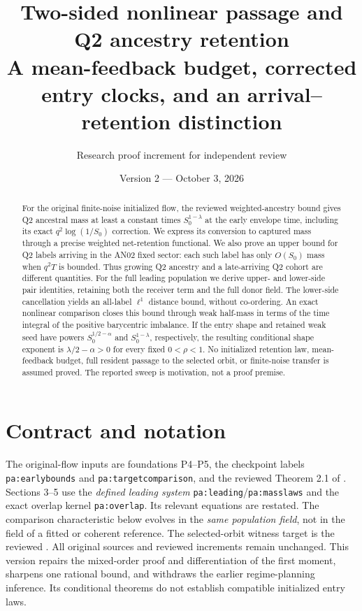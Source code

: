 \documentclass[11pt]{article}
\title{Two-sided nonlinear passage and Q2 ancestry retention\\
\large A mean-feedback budget, corrected entry clocks, and an arrival--retention distinction}
\author{Research proof increment for independent review}
\date{Version 2 --- October 3, 2026}
\numberwithin{equation}{section}
\theoremstyle{remark}\newtheorem{remark}[theorem]{Remark}
\newcommand{\1}{\mathbf 1}
\begin{document}
\maketitle
\begin{abstract}
For the original finite-noise initialized flow, the reviewed weighted-ancestry
bound gives Q2 ancestral mass at least a constant times
$S_0^{1-\lambda}$ at the early envelope time, including its exact
$q^2\log(1/S_0)$ correction. We express its conversion to captured mass
through a precise weighted net-retention functional. We also prove an
upper bound for Q2 labels arriving in the AN02 fixed sector: each such
label has only $O(S_0)$ mass when $q^2T$ is bounded. Thus growing Q2
ancestry and a late-arriving Q2 cohort are different quantities.
For the full leading population we derive upper- and lower-side pair
identities, retaining both the receiver term and the full donor field.
The lower-side cancellation yields an all-label $\ell^1$ distance bound,
without co-ordering. An exact nonlinear comparison closes this bound
through weak half-mass in terms of the time integral of the positive
barycentric imbalance. If the entry shape and retained weak seed have
powers $S_0^{1/2-\alpha}$ and $S_0^{1-\lambda}$, respectively, the resulting
conditional shape exponent is $\lambda/2-\alpha>0$ for every fixed
$0<\rho<1$. No initialized retention law, mean-feedback budget, full
resident passage to the selected orbit, or finite-noise transfer is
assumed proved. The reported sweep is motivation, not a proof premise.
\end{abstract}

\section{Contract and notation}\label{inc:AN03:ret:v2:contract}
The original-flow inputs are foundations P4--P5, the checkpoint labels
\texttt{pa:earlybounds} and \texttt{pa:targetcomparison}, and the reviewed
Theorem 2.1 of .
Sections 3--5 use the \emph{defined leading system}
\texttt{pa:leading}/\texttt{pa:masslaws} and the exact overlap kernel
\texttt{pa:overlap}. Its relevant equations are restated. The comparison
characteristic below evolves in the \emph{same population field}, not
in the field of a fitted or coherent reference. The selected-orbit witness
target is the reviewed .
All original sources and reviewed increments remain unchanged. This version repairs the mixed-order proof and differentiation of the first moment, sharpens one rational bound, and withdraws the earlier regime-planning inference. Its conditional theorems do not establish compatible initialized entry laws.
\end{document}
